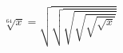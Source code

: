\documentclass{article}
\begin{document}
\[
  \sqrt[64]{x} = \sqrt{\sqrt{\sqrt{\sqrt{\sqrt{\sqrt{x}}}}}}
\]
\end{document}
